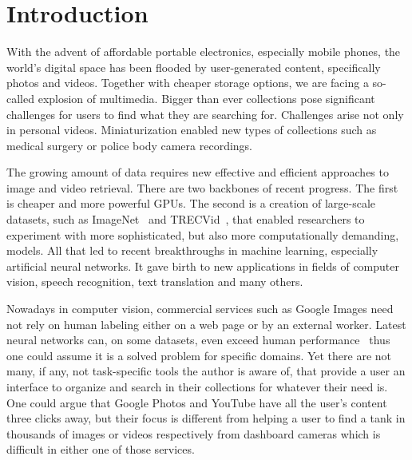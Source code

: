 \chapter*{Introduction}


With the advent of affordable portable electronics, especially mobile phones, the world's digital space has been flooded by user-generated content, specifically photos and videos. Together with cheaper storage options, we are facing a so-called explosion of multimedia. Bigger than ever collections pose significant challenges for users to find what they are searching for. Challenges arise not only in personal videos. Miniaturization enabled new types of collections such as medical surgery or police body camera recordings.

The growing amount of data requires new effective and efficient approaches to image and video retrieval. There are two backbones of recent progress. The first is cheaper and more powerful GPUs. The second is a creation of large-scale datasets, such as ImageNet~\cite{ILSVRC15} and TRECVid~\cite{2017trecvidawad}, that enabled researchers to experiment with more sophisticated, but also more computationally demanding, models. All that led to recent breakthroughs in machine learning, especially artificial neural networks. It gave birth to new applications in fields of computer vision, speech recognition, text translation and many others.

Nowadays in computer vision, commercial services such as Google Images need not rely on human labeling either on a web page or by an external worker. Latest neural networks can, on some datasets, even exceed human performance~\cite{he2015delving} thus one could assume it is a solved problem for specific domains. Yet there are not many, if any, not task-specific tools the author is aware of, that provide a user an interface to organize and search in their collections for whatever their need is. One could argue that Google Photos and YouTube have all the user's content three clicks away, but their focus is different from helping a user to find a tank in thousands of images or videos respectively from dashboard cameras which is difficult in either one of those services.

